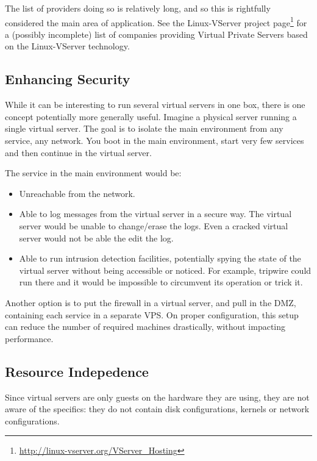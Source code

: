 The list of providers doing so is relatively long, and so this is rightfully
considered the main area of application. See the Linux-VServer project
page\footnote{\url{http://linux-vserver.org/VServer_Hosting}} for a (possibly
incomplete) list of companies providing Virtual Private Servers based on the
Linux-VServer technology.


\subsection{Enhancing Security}

While it can be interesting to run several virtual servers in one box, there is
one concept potentially more generally useful. Imagine a physical server
running a single virtual server. The goal is to isolate the main environment
from any service, any network. You boot in the main environment, start very few
services and then continue in the virtual server.

The service in the main environment would be:

\begin{itemize}
	\item Unreachable from the network.

	\item Able to log messages from the virtual server in a secure way. The
		virtual server would be unable to change/erase the logs. Even a cracked
		virtual server would not be able the edit the log.

	\item Able to run intrusion detection facilities, potentially spying the
		state of the virtual server without being accessible or noticed. For
		example, tripwire could run there and it would be impossible to
		circumvent its operation or trick it.
\end{itemize}

Another option is to put the firewall in a virtual server, and pull in the DMZ,
containing each service in a separate VPS. On proper configuration, this setup
can reduce the number of required machines drastically, without impacting
performance.


\subsection{Resource Indepedence}

Since virtual servers are only guests on the hardware they are using, they are
not aware of the specifics: they do not contain disk configurations, kernels or
network configurations.

